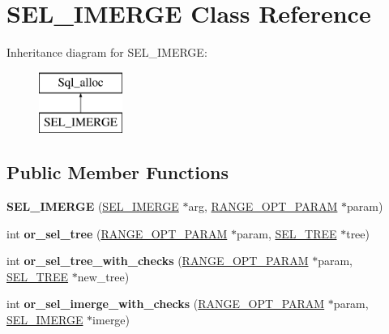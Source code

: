 \hypertarget{classSEL__IMERGE}{}\section{S\+E\+L\+\_\+\+I\+M\+E\+R\+GE Class Reference}
\label{classSEL__IMERGE}
Inheritance diagram for S\+E\+L\+\_\+\+I\+M\+E\+R\+GE\+:\begin{figure}[H]
\begin{center}
\leavevmode
\includegraphics[height=2.000000cm]{classSEL__IMERGE}
\end{center}
\end{figure}
\subsection*{Public Member Functions}
\begin{DoxyCompactItemize}
\item 
\mbox{\label{classSEL__IMERGE_a97f9c43966c2f4bc606f8c9dfd420926}} 
{\bfseries S\+E\+L\+\_\+\+I\+M\+E\+R\+GE} (\mbox{\hyperlink{classSEL__IMERGE}{S\+E\+L\+\_\+\+I\+M\+E\+R\+GE}} $\ast$arg, \mbox{\hyperlink{classRANGE__OPT__PARAM}{R\+A\+N\+G\+E\+\_\+\+O\+P\+T\+\_\+\+P\+A\+R\+AM}} $\ast$param)
\item 
\mbox{\label{classSEL__IMERGE_a892d2b944f8e19699a1c74b620533afd}} 
int {\bfseries or\+\_\+sel\+\_\+tree} (\mbox{\hyperlink{classRANGE__OPT__PARAM}{R\+A\+N\+G\+E\+\_\+\+O\+P\+T\+\_\+\+P\+A\+R\+AM}} $\ast$param, \mbox{\hyperlink{classSEL__TREE}{S\+E\+L\+\_\+\+T\+R\+EE}} $\ast$tree)
\item 
\mbox{\label{classSEL__IMERGE_a8bd7e7c3acd7a46a647edff6552ef458}} 
int {\bfseries or\+\_\+sel\+\_\+tree\+\_\+with\+\_\+checks} (\mbox{\hyperlink{classRANGE__OPT__PARAM}{R\+A\+N\+G\+E\+\_\+\+O\+P\+T\+\_\+\+P\+A\+R\+AM}} $\ast$param, \mbox{\hyperlink{classSEL__TREE}{S\+E\+L\+\_\+\+T\+R\+EE}} $\ast$new\+\_\+tree)
\item 
\mbox{\label{classSEL__IMERGE_aa003fd0af7097bed33373d94c285db3d}} 
int {\bfseries or\+\_\+sel\+\_\+imerge\+\_\+with\+\_\+checks} (\mbox{\hyperlink{classRANGE__OPT__PARAM}{R\+A\+N\+G\+E\+\_\+\+O\+P\+T\+\_\+\+P\+A\+R\+AM}} $\ast$param, \mbox{\hyperlink{classSEL__IMERGE}{S\+E\+L\+\_\+\+I\+M\+E\+R\+GE}} $\ast$imerge)
\end{DoxyCompactItemize}
